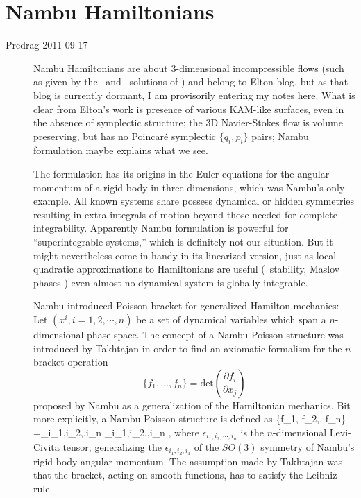 \newpage
\section{Nambu Hamiltonians}
\label{sect:Nambu}

\begin{description}

\item[Predrag 2011-09-17 ]
Nambu Hamiltonians are about 3-dimensional
incompressible flows (such as given by the \eqv\ and \po\ solutions of
\pCf) and belong to Elton blog, but as that blog is currently dormant, I
am provisorily entering my notes here. What is clear from Elton's work is
presence of various KAM-like surfaces, even in the absence of symplectic
structure; the 3D Navier-Stokes flow is volume preserving, but has no
Poincar\'e symplectic $\{q_i,p_i\}$ pairs; Nambu formulation maybe
explains what we see.

The formulation has its origins in the Euler equations for the angular
momentum of a rigid body in three dimensions, which was Nambu's only
example. All known systems share possess dynamical or hidden symmetries
resulting in extra integrals of motion beyond those needed for complete
integrability. Apparently  Nambu formulation is powerful for
``superintegrable systems,'' which is definitely not our situation.
But it might nevertheless come in handy in its linearized version, just as
local quadratic approximations to Hamiltonians are useful (\po\ stability,
Maslov phases \etc) even almost no dynamical system is globally integrable.

Nambu introduced Poisson bracket for generalized Hamilton
mechanics: Let $(x^i,i=1,2,\cdots, n)$ be a set of dynamical variables
which span a $n$-dimensional phase space. The concept of a Nambu-Poisson
structure was introduced by Takhtajan in order to find an
axiomatic formalism for the $n$-bracket operation
\[
\{f_1, . . . , f_n\} =
\mbox{det} \left( \frac{\partial f_{i}}{\partial x_{j} } \right)
\]
proposed by Nambu as a generalization of the Hamiltonian
mechanics.
Bit more explicitly, a Nambu-Poisson structure is defined as
\beq
\{f_1, f_2,\cdots, f_n\} =\sum_{i_1,i_2,\cdots,i_n}
\epsilon_{i_1,i_2,\cdots,i_n} 
\cdots {},
where $\epsilon_{i_1,i_2,\cdots,i_n}$ is the $n$-dimensional Levi-Civita
tensor; generalizing the  $\epsilon_{i_1,i_2,i_3}$ of the $SO(3)$
symmetry of Nambu's rigid body angular momentum. The assumption made by
Takhtajan was that the bracket, acting on smooth functions, has to
satisfy the Leibniz rule.


\end{description}
